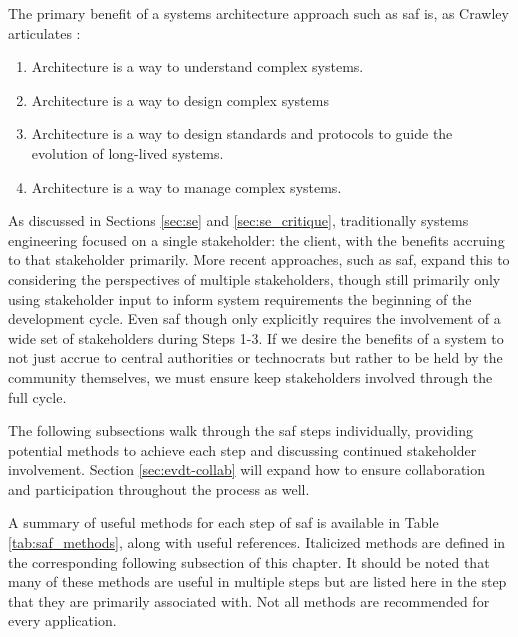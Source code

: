 The primary benefit of a systems architecture approach such as \ac{saf} is, as Crawley articulates
\cite{crawley2004}:

\begin{enumerate}[itemsep=0pt,parsep=0pt]
	\item{Architecture is a way to understand complex systems.}
	\item{Architecture is a way to design complex systems}
	\item{Architecture is a way to design standards and protocols to guide the evolution of long-lived systems.}
	\item{Architecture is a way to manage complex systems.}
\end{enumerate}

As discussed in Sections \ref{sec:se} and \ref{sec:se_critique}, traditionally systems engineering focused on a single stakeholder: the client, with the benefits accruing to that stakeholder primarily. More recent approaches, such as \ac{saf}, expand this to considering the perspectives of multiple stakeholders, though still primarily only using stakeholder input to inform system requirements the beginning of the development cycle. Even \ac{saf} though only explicitly requires the involvement of a wide set of stakeholders during Steps 1-3. If we desire the benefits of a system to not just accrue to central authorities or technocrats but rather to be held by the community themselves, we must ensure keep stakeholders involved through the full cycle.

The following subsections walk through the \ac{saf} steps individually, providing potential methods to achieve each step and discussing continued stakeholder involvement. Section \ref{sec:evdt-collab} will expand how to ensure collaboration and participation throughout the process as well.

A summary of useful methods for each step of \ac{saf} is available in Table \ref{tab:saf_methods}, along with useful references. Italicized methods are defined in the corresponding following subsection of this chapter. It should be noted that many of these methods are useful in multiple steps but are listed here in the step that they are primarily associated with. Not all methods are recommended for every application. 

